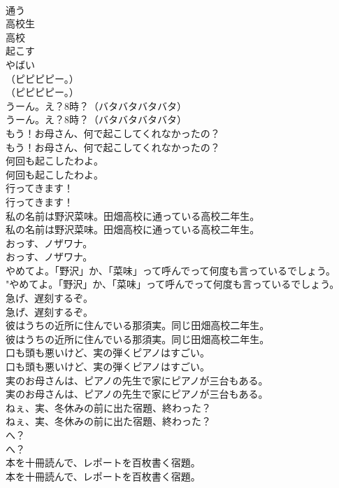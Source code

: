 \documentclass[8pt]{extreport}
\begin{document}
\begin{CJK}{UTF8}{min}
\\	通う
\\	高校生
\\	高校
\\	起こす
\\	やばい
\\	（ピピピピー。）	
\\	（ピピピピー。） 
\\	うーん。え？8時？（バタバタバタバタ）	
\\	うーん。え？8時？（バタバタバタバタ） 
\\	もう！お母さん、何で起こしてくれなかったの？	
\\	もう！お母さん、何で起こしてくれなかったの？ 
\\	何回も起こしたわよ。	
\\	何回も起こしたわよ。 
\\	行ってきます！	
\\	行ってきます！ 
\\	私の名前は野沢菜味。田畑高校に通っている高校二年生。	
\\	私の名前は野沢菜味。田畑高校に通っている高校二年生。 
\\	おっす、ノザワナ。	
\\	おっす、ノザワナ。 
\\	やめてよ。「野沢」か、「菜味」って呼んでって何度も言っているでしょう。	
\\	"やめてよ。「野沢」か、「菜味」って呼んでって何度も言っているでしょう。 
\\	急げ、遅刻するぞ。	
\\	急げ、遅刻するぞ。 
\\	彼はうちの近所に住んでいる那須実。同じ田畑高校二年生。	
\\	彼はうちの近所に住んでいる那須実。同じ田畑高校二年生。 
\\	口も頭も悪いけど、実の弾くピアノはすごい。	
\\	口も頭も悪いけど、実の弾くピアノはすごい。 
\\	実のお母さんは、ピアノの先生で家にピアノが三台もある。	
\\	実のお母さんは、ピアノの先生で家にピアノが三台もある。 
\\	ねぇ、実、冬休みの前に出た宿題、終わった？	
\\	ねぇ、実、冬休みの前に出た宿題、終わった？ 
\\	へ？	
\\	へ？ 
\\	本を十冊読んで、レポートを百枚書く宿題。	
\\	本を十冊読んで、レポートを百枚書く宿題。 

\end{CJK}
\end{document}
